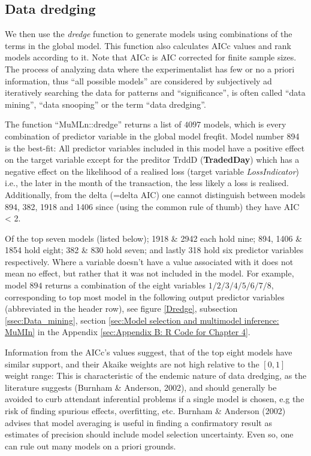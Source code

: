 \documentclass{DissertateUSU}
\begin{document}
\singlespacing

\doublespacing

\subsection{Data dredging}

We then use the \emph{dredge} function to generate models using
combinations of the terms in the global model. This function also
calculates AICc values and rank models according to it. Note that AICc
is AIC corrected for finite sample sizes. The process of analyzing data
where the experimentalist has few or no a priori information, thus ``all
possible models'' are considered by subjectively ad iteratively
searching the data for patterns and ``significance'', is often called
``data mining'', ``data snooping'' or the term ``data dredging''.

\singlespacing

\doublespacing

The function ``MuMLn::dredge'' returns a list of \(4097\) models, which
is every combination of predictor variable in the global model freqfit.
Model number 894 is the best-fit: All predictor variables included in
this model have a positive effect on the target variable except for the
preditor TrddD (\textbf{TradedDay}) which has a negative effect on the
likelihood of a realised loss (target variable \emph{LossIndicator})
i.e., the later in the month of the transaction, the less likely a loss
is realised. Additionally, from the delta (=delta AIC) one cannot
distinguish between models 894, 382, 1918 and 1406 since (using the
common rule of thumb) they have AIC \textless{} 2.\medskip

Of the top seven models (listed below); 1918 \& 2942 each hold nine;
894, 1406 \& 1854 hold eight; 382 \& 830 hold seven; and lastly 318 hold
six predictor variables respectively. Where a variable doesn't have a
value associated with it does not mean no effect, but rather that it was
not included in the model. For example, model \(894\) returns a
combination of the eight variables \(1/2/3/4/5/6/7/8\), corresponding to
top most model in the following output predictor variables (abbreviated
in the header row), see figure \ref{Dredge}, subsection
\ref{ssec:Data_mining}, section
\ref{sec:Model selection and multimodel inference: MuMIn} in the
Appendix \ref{sec:Appendix B: R Code for Chapter 4}.\medskip

Information from the AICc's values suggest, that of the top eight models
have similar support, and their Akaike weights are not high relative to
the \([0,1]\) weight range: This is characteristic of the endemic nature
of data dredging, as the literature suggests (Burnham \& Anderson,
2002), and should generally be avoided to curb attendant inferential
problems if a single model is chosen, e.g the risk of finding spurious
effects, overfitting, etc. Burnham \& Anderson (2002) advises that model
averaging is useful in finding a confirmatory result as estimates of
precision should include model selection uncertainty. Even so, one can
rule out many models on a priori grounds.\medskip    
\end{document}
